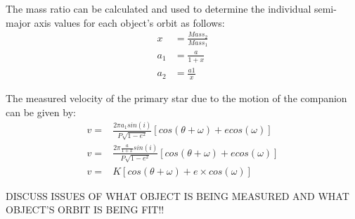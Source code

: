 \documentclass[10pt,preprint]{aastex}
\begin{document}
The mass ratio can be calculated and used to determine the individual semi-major axis values for each object's orbit as follows:
\begin{subequations}
\begin{align}
\label{eq:massRatio}
x& = \frac{Mass_2}{Mass_1}\\
\label{eq:massRatio-a1}
a_1& = \frac{a}{1+x}\\
\label{eq:massRatio-a2}
a_2& = \frac{a1}{x}
\end{align}
\end{subequations}

The measured velocity of the primary star due to the motion of the companion can be given by:
\begin{subequations}
\begin{align}
\label{eq:v-a}
v =& \frac{2\pi a_1sin(i)}{P\sqrt{1-e^2}}[cos(\theta+\omega)+e cos(\omega)]\\
\label{eq:v-b}
v =& \frac{2\pi \frac{a}{1+x}sin(i)}{P\sqrt{1-e^2}}[cos(\theta+\omega)+e cos(\omega)]\\
\label{eq:v-c}
v =& K[cos(\theta+\omega)+e\times cos(\omega)]
\end{align}
\end{subequations}

{\color{red} DISCUSS ISSUES OF WHAT OBJECT IS BEING MEASURED AND WHAT OBJECT'S ORBIT IS BEING FIT!!}

\pagebreak

\clearpage
\end{document}

